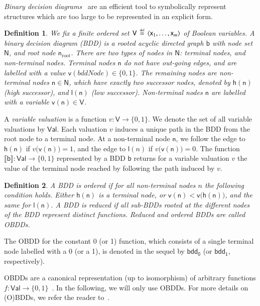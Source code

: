 \documentclass[10pt,twocolumn]{article}
\newtheorem{definition}{Definition}
\newcommand{\bdd}{\mathsf{b}}
\newcommand{\bddVars}{\mathsf{V}}
\newcommand{\bddVar}{\mathsf{x}}
\newcommand{\bddNodeInit}{\bddNode_{\mathrm{root}}}
\newcommand{\bddNodes}{\mathsf{N}}
\newcommand{\bddNode}{\mathsf{n}}
\newcommand{\bddHi}{\mathsf{h}}
\newcommand{\bddLo}{\mathsf{l}}
\newcommand{\bddNV}{\mathsf{v}}
\newcommand{\bddZero}{\mathsf{bdd}_{\mathsf{0}}}
\newcommand{\bddOne}{\mathsf{bdd}_{\mathsf{1}}}
\newcommand{\bddEval}{\mathsf{Val}}
\newcommand{\defeq}{\,\stackrel{\mbox{\rm {\tiny def}}}{=}\,}
\newcommand{\sem}[1]{\ensuremath{\llbracket #1 \rrbracket}\xspace}
\begin{document}
\noindent\emph{Binary decision diagrams}~\cite{Bry86} are an efficient tool to
symbolically represent structures which are too large to be represented in an
explicit form.
\begin{definition}
  \label{def:bdd}
  We fix a finite ordered set $\bddVars \defeq \langle \bddVar_1, \ldots,
  \bddVar_m\rangle$ of \emph{Boolean variables}.
  A \emph{binary decision diagram} (BDD) is a rooted acyclic directed graph
  $\bdd$ with node set $\bddNodes$, and root node $\bddNodeInit$. There are two
  types of nodes in $\bddNodes$: terminal nodes, and non-terminal nodes.
  \emph{Terminal} nodes $\bddNode$ do not have out-going edges, and are
  labelled with a value $\bddNV(bddNode)\in\{0,1\}$. The remaining nodes are
  \emph{non-terminal} nodes $\bddNode\in\bddNodes$, which have exactly two successor nodes, denoted by
  $\bddHi(\bddNode)$ (\emph{high} successor), and $\bddLo(\bddNode)$ (\emph{low} successor).
  Non-terminal nodes $\bddNode$ are labelled with a variable
  $\bddNV(\bddNode)\in\bddVars$.
\end{definition}
A \emph{variable valuation} is a function $v\colon \bddVars \to \{0,1\}$.
We denote the set of all variable valuations by $\bddEval$.
Each valuation $v$ induces a unique path in the BDD from the root node to a
terminal node.
At a non-terminal node $\bddNode$, we follow the edge to $\bddHi(\bddNode)$ if
$v\bigl(\bddNV(\bddNode)\bigr) = 1$, and the edge to $\bddLo(n)$ if
$v\bigl(\bddNV(\bddNode)\bigr)=0$. The function $\sem{\bdd}:\bddEval\to\{0,1\}$
represented by a BDD $\bdd$ returns for a variable valuation $v$ the value of
the terminal node reached by following the path induced by $v$.
\begin{definition}
  \label{def:reduced_ordered}
  A BDD is \emph{ordered} if for all non-terminal nodes $n$ the following condition
  holds.
  Either $\bddHi(\bddNode)$ is a terminal node, or $\bddNV(\bddNode) <
  \bddNV\bigl(\bddHi(\bddNode)\bigr)$, and the same for $\bddLo(\bddNode)$. A BDD is
  \emph{reduced} if all sub-BDDs rooted at the different nodes of the
  BDD represent distinct functions. Reduced and ordered BDDs are called
  \emph{OBDDs}.
\end{definition}

The OBDD for the constant 0 (or 1) function, which consists of a single 
terminal node labelled with a 0 (or a 1), is denoted in the sequel 
by $\bddZero$ (or $\bddOne$, respectively).

OBDDs are a canonical representation (up to isomorphism) of
arbitrary functions $f\colon\bddEval\to\{0,1\}$~\cite{Bry86}. In the following, we
will only use OBDDs. For more details on (O)BDDs, we refer the reader
to~\cite{Bry86,Weg00}.
\end{document}
